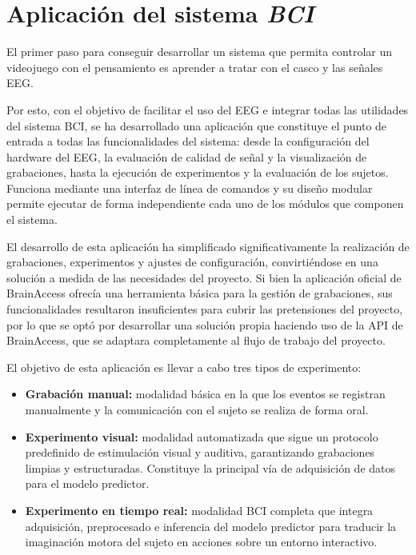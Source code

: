 \chapter{Aplicación del sistema \textit{BCI}}
\label{cap:aplicacionBCI}

El primer paso para conseguir desarrollar un sistema que permita controlar un videojuego con el pensamiento es aprender a tratar con el casco y las señales EEG. 

Por esto, con el objetivo de facilitar el uso del EEG e integrar todas las utilidades del sistema BCI, se ha desarrollado una aplicación que constituye el punto de entrada a todas las funcionalidades del sistema: desde la configuración del hardware del EEG, la evaluación de calidad de señal y la visualización de grabaciones, hasta la ejecución de experimentos y la evaluación de los sujetos. Funciona mediante una interfaz de línea de comandos y su diseño modular permite ejecutar de forma independiente cada uno de los módulos que componen el sistema.

El desarrollo de esta aplicación ha simplificado significativamente la realización de grabaciones, experimentos y ajustes de configuración, convirtiéndose en una solución a medida de las necesidades del proyecto. Si bien la aplicación oficial de BrainAccess ofrecía una herramienta básica para la gestión de grabaciones, sus funcionalidades resultaron insuficientes para cubrir las pretensiones del proyecto, por lo que se optó por desarrollar una solución propia haciendo uso de la API de BrainAccess, que se adaptara completamente al flujo de trabajo del proyecto.

El objetivo de esta aplicación es llevar a cabo tres tipos de experimento:

\begin{itemize}
\item \textbf{Grabación manual:} modalidad básica en la que los eventos se registran manualmente y la comunicación con el sujeto se realiza de forma oral.

\item \textbf{Experimento visual:} modalidad automatizada que sigue un protocolo predefinido de estimulación visual y auditiva, garantizando grabaciones limpias y estructuradas. Constituye la principal vía de adquisición de datos para el modelo predictor.

\item \textbf{Experimento en tiempo real:} modalidad BCI completa que integra adquisición, preprocesado e inferencia del modelo predictor para traducir la imaginación motora del sujeto en acciones sobre un entorno interactivo.\end{itemize}

